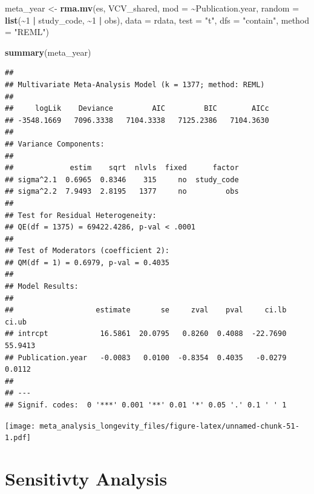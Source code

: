 \documentclass[
]{article}
\newenvironment{Shaded}{\begin{snugshade}}{\end{snugshade}}
\newcommand{\AttributeTok}[1]{\textcolor[rgb]{0.13,0.29,0.53}{#1}}
\newcommand{\DecValTok}[1]{\textcolor[rgb]{0.00,0.00,0.81}{#1}}
\newcommand{\FunctionTok}[1]{\textcolor[rgb]{0.13,0.29,0.53}{\textbf{#1}}}
\newcommand{\NormalTok}[1]{#1}
\newcommand{\OtherTok}[1]{\textcolor[rgb]{0.56,0.35,0.01}{#1}}
\newcommand{\SpecialCharTok}[1]{\textcolor[rgb]{0.81,0.36,0.00}{\textbf{#1}}}
\newcommand{\StringTok}[1]{\textcolor[rgb]{0.31,0.60,0.02}{#1}}
\begin{document}
\begin{Shaded}
\begin{Highlighting}[]
\NormalTok{meta\_year }\OtherTok{\textless{}{-}} \FunctionTok{rma.mv}\NormalTok{(es, VCV\_shared, }\AttributeTok{mod =} \SpecialCharTok{\textasciitilde{}}\NormalTok{Publication.year,}
    \AttributeTok{random =} \FunctionTok{list}\NormalTok{(}\SpecialCharTok{\textasciitilde{}}\DecValTok{1} \SpecialCharTok{|}\NormalTok{ study\_code, }\SpecialCharTok{\textasciitilde{}}\DecValTok{1} \SpecialCharTok{|}\NormalTok{ obs), }\AttributeTok{data =}\NormalTok{ rdata, }\AttributeTok{test =} \StringTok{"t"}\NormalTok{,}
    \AttributeTok{dfs =} \StringTok{"contain"}\NormalTok{, }\AttributeTok{method =} \StringTok{"REML"}\NormalTok{)}
\end{Highlighting}
\end{Shaded}

\begin{Shaded}
\begin{Highlighting}[]
\FunctionTok{summary}\NormalTok{(meta\_year)}
\end{Highlighting}
\end{Shaded}

\begin{verbatim}
## 
## Multivariate Meta-Analysis Model (k = 1377; method: REML)
## 
##     logLik    Deviance         AIC         BIC        AICc   
## -3548.1669   7096.3338   7104.3338   7125.2386   7104.3630   
## 
## Variance Components:
## 
##             estim    sqrt  nlvls  fixed      factor 
## sigma^2.1  0.6965  0.8346    315     no  study_code 
## sigma^2.2  7.9493  2.8195   1377     no         obs 
## 
## Test for Residual Heterogeneity:
## QE(df = 1375) = 69422.4286, p-val < .0001
## 
## Test of Moderators (coefficient 2):
## QM(df = 1) = 0.6979, p-val = 0.4035
## 
## Model Results:
## 
##                   estimate       se     zval    pval     ci.lb    ci.ub    
## intrcpt            16.5861  20.0795   0.8260  0.4088  -22.7690  55.9413    
## Publication.year   -0.0083   0.0100  -0.8354  0.4035   -0.0279   0.0112    
## 
## ---
## Signif. codes:  0 '***' 0.001 '**' 0.01 '*' 0.05 '.' 0.1 ' ' 1
\end{verbatim}

\newpage

\texttt{[image: meta\_analysis\_longevity\_files/figure-latex/unnamed-chunk-51-1.pdf]}

\newpage

\hypertarget{sensitivty-analysis}{%
\section{Sensitivty Analysis}\label{sensitivty-analysis}}
\end{document}
